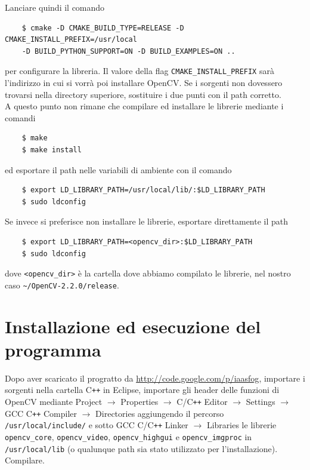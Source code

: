 \documentclass[12pt]{report}
\begin{document}
\noindent Lanciare quindi il comando

\begin{verbatim}
	$ cmake -D CMAKE_BUILD_TYPE=RELEASE -D CMAKE_INSTALL_PREFIX=/usr/local
	-D BUILD_PYTHON_SUPPORT=ON -D BUILD_EXAMPLES=ON ..
\end{verbatim}

\noindent per configurare la libreria. Il valore della flag \verb|CMAKE_INSTALL_PREFIX| sar\`a l'indirizzo in cui si vorr\`a poi installare OpenCV. Se i sorgenti non dovessero trovarsi nella directory superiore, sostituire i due punti con il path corretto.\\

\noindent A questo punto non rimane che compilare ed installare le librerie mediante i comandi

\begin{verbatim}
	$ make
	$ make install
\end{verbatim}

\noindent ed esportare il path nelle variabili di ambiente con il comando

\begin{verbatim}
	$ export LD_LIBRARY_PATH=/usr/local/lib/:$LD_LIBRARY_PATH
	$ sudo ldconfig
\end{verbatim}

\noindent Se invece si preferisce non installare le librerie, esportare direttamente il path 

\begin{verbatim}
	$ export LD_LIBRARY_PATH=<opencv_dir>:$LD_LIBRARY_PATH
	$ sudo ldconfig
\end{verbatim}

\noindent dove \verb|<opencv_dir>| \`e la cartella dove abbiamo compilato le librerie, nel nostro caso \verb|~/OpenCV-2.2.0/release|.

\section{Installazione ed esecuzione del programma}

\noindent Dopo aver scaricato il progratto da \url{http://code.google.com/p/iaasfog}, importare i sorgenti nella cartella C\verb|++| in Eclipse, importare gli header delle funzioni di OpenCV mediante Project $\rightarrow$ Properties  $\rightarrow$ C\slash C\verb|++| Editor $\rightarrow$ Settings $\rightarrow$ GCC C\verb|++| Compiler $\rightarrow$ Directories aggiungendo il percorso \verb|/usr/local/include/| e sotto GCC C\slash C\verb|++| Linker $\rightarrow$ Libraries le librerie \verb|opencv_core|, \verb|opencv_video|, \verb|opencv_highgui| e \verb|opencv_imgproc| in \verb|/usr/local/lib| (o qualunque path sia stato utilizzato per l'installazione).\\
Compilare.\\
\end{document}
